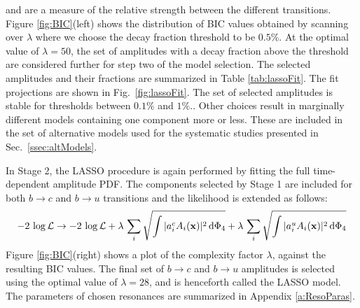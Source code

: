 and are a measure of the relative strength between the different transitions. 
Figure \ref{fig:BIC}(left) shows the distribution of BIC values obtained by scanning over $\lambda$
where we choose the decay fraction threshold to be $0.5 \%$.
At the optimal value of $\lambda=50$, the set of amplitudes with a decay fraction above the threshold 
are considered further for step two of the model selection.
The selected amplitudes and their fractions are summarized in Table \ref{tab:lassoFit}.
The fit projections are shown in Fig.~\ref{fig:lassoFit}.
The set of selected amplitudes is stable for thresholds between $0.1\%$ and $1\%.$. 
Other choices result in marginally different models containing one component more or less. These are included in the set of alternative models used for the systematic studies presented in Sec.~\ref{ssec:altModels}.

In Stage 2, the LASSO procedure is again performed by fitting the full time-dependent amplitude PDF.
The components selected by Stage 1 are included for both $b\to c$ and $b\to u$ transitions and the likelihood is extended as follows:
\begin{equation}
	-2 \, \log \mathcal L \rightarrow -2 \, \log \mathcal L + \lambda \, \sum_{i} \sqrt{ \int \vert a^{c}_i  A_i(\mathbf{x}) \vert^{2} \, \text{d}\Phi_{4}  }  + \lambda \, \sum_{i} \sqrt{ \int \vert a^{u}_i  A_i(\mathbf{x}) \vert^{2} \, \text{d}\Phi_{4}  } 
\end{equation}
Figure \ref{fig:BIC}(right) shows a plot of the complexity factor
$\lambda$, against the resulting BIC values. 
The final set of $b\to c$ and $b\to u$ amplitudes is selected using the optimal value of $\lambda=28$, and is henceforth called the LASSO model.
The parameters of chosen resonances are summarized in Appendix \ref{a:ResoParas}.

